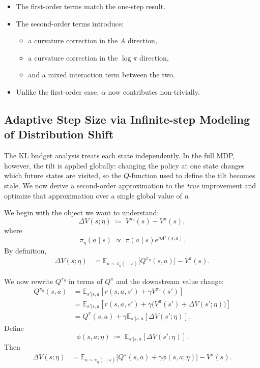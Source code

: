 \documentclass[11pt]{article}
\theoremstyle{definition}
\theoremstyle{remark}
\newcommand{\E}{\mathbb{E}}
\begin{document}
\begin{itemize}
\item The first-order terms match the one-step result.
\item The second-order terms introduce:
  \begin{itemize}
  \item a curvature correction in the $A$ direction,
  \item a curvature correction in the $\log \pi$ direction,
  \item and a mixed interaction term between the two.
  \end{itemize}
\item Unlike the first-order case, $\alpha$ now contributes non-trivially.
\end{itemize}

\subsection{Adaptive Step Size via Infinite-step Modeling of Distribution Shift}
\label{sec:optimal-eta}

The KL budget analysis treats each state independently. In the full MDP, however, the tilt is applied globally: changing the policy at one state changes which future states are visited, so the $Q$-function used to define the tilt becomes stale. We now derive a second-order approximation to the \emph{true} improvement and optimize that approximation over a single global value of $\eta$.

We begin with the object we want to understand:
\begin{equation}
  \Delta V(s;\eta)
  \;\coloneqq\;
  V^{\pi_\eta}(s) - V^\pi(s),
\end{equation}
where
\[
  \pi_\eta(a\mid s)
  \;\propto\;
  \pi(a\mid s)e^{\eta A^\pi(s,a)}.
\]
By definition,
\begin{align}
  \Delta V(s;\eta)
  &=
  \E_{a\sim \pi_\eta(\cdot\mid s)}\!\bigl[Q^{\pi_\eta}(s,a)\bigr] - V^\pi(s).
\end{align}

We now rewrite $Q^{\pi_\eta}$ in terms of $Q^\pi$ and the downstream value change:
\begin{align}
  Q^{\pi_\eta}(s,a)
  &= \E_{s'|s,a}\!\left[r(s,a,s') + \gamma V^{\pi_\eta}(s')\right] \nonumber\\
  &= \E_{s'|s,a}\!\left[r(s,a,s') + \gamma\bigl(V^\pi(s') + \Delta V(s';\eta)\bigr)\right] \nonumber\\
  &= Q^\pi(s,a) + \gamma \E_{s'|s,a}[\Delta V(s';\eta)].
\end{align}
Define
\begin{equation}
  \phi(s,a;\eta)
  \;\coloneqq\;
  \E_{s'|s,a}[\Delta V(s';\eta)].
\end{equation}
Then
\begin{align}
  \Delta V(s;\eta)
  &=
  \E_{a\sim \pi_\eta(\cdot\mid s)}\!\bigl[Q^\pi(s,a) + \gamma \phi(s,a;\eta)\bigr] - V^\pi(s).
\end{align}
\end{document}

